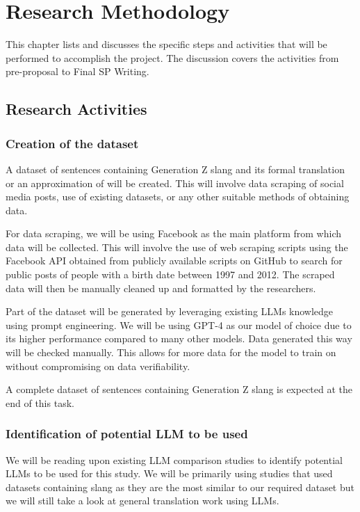 \chapter{Research Methodology}
This chapter lists and discusses the specific steps and activities that will be performed to accomplish the project. 
The discussion covers the activities from pre-proposal to Final SP Writing.

\section{Research Activities}
\subsection{Creation of the dataset} 
A dataset of sentences containing Generation Z slang and its formal translation or an approximation of will be created. 
This will involve data scraping of social media posts, use of existing datasets, or any other suitable methods of obtaining data.

For data scraping, we will be using Facebook as the main platform from which data will be collected.
This will involve the use of web scraping scripts using the Facebook API obtained from publicly available scripts on GitHub to search for public posts of people with a birth date between 1997 and 2012. 
The scraped data will then be manually cleaned up and formatted by the researchers.

Part of the dataset will be generated by leveraging existing LLMs knowledge using prompt engineering. We will be using GPT-4 as our model of choice due to its higher performance compared to many other models. Data generated this way will be checked manually. This allows for more data for the model to train on without compromising on data verifiability.

A complete dataset of sentences containing Generation Z slang is expected at the end of this task. 

\subsection{Identification of potential LLM to be used}
We will be reading upon existing LLM comparison studies to identify potential LLMs to be used for this study.
We will be primarily using studies that used datasets containing slang as they are the most similar to our required dataset but we will still take a look at general translation work using LLMs.


